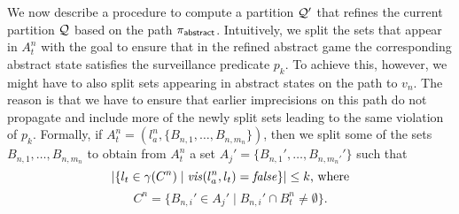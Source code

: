 We now describe a procedure to compute a partition $\mathcal{Q}'$ that refines the current partition $\mathcal{Q}$ based on the path $\pi_{\mathsf{abstract}}$. Intuitively, we split the sets that appear in $A_t^n$ with the goal to ensure that in the refined abstract game the corresponding abstract state satisfies the surveillance predicate $p_k$. To achieve this, however, we might have to also split sets appearing in abstract states on the path to $v_n$. The reason is that we have to ensure that earlier imprecisions on this path do not propagate and include more of the newly split sets leading to the same violation of $p_k$.
Formally, if $A_t^n = (l_a^n,\{B_{n,1},\ldots,B_{n,m_n}\})$, then we split some of the sets $B_{n,1},\ldots,B_{n,m_n}$ to obtain from $A_t^n$ a set $A_j' = \{B_{n,1}',\ldots,B_{n,m_n'}'\}$ such that
\[|\{l_t \in \gamma(C^n) \mid \mathit{vis}(l_a^n,l_t) = \mathit{false}\}| \leq k \text{, where}\] 
\[C^n = \{B_{n,i}' \in A_j' \mid B_{n,i}' \cap B_t^n \neq \emptyset\}.\]
